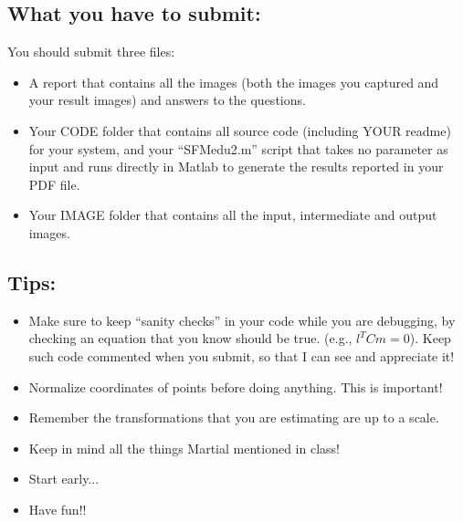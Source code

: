 \documentclass[11pt]{article}
\begin{document}
\subsection{What you have to submit:}
\label{sec:tosubmit}
You should submit three files:
\begin{itemize}
\item A report that contains all the images (both the images you captured and your result images) and answers to the questions.
\item Your CODE folder that contains all source code (including YOUR readme) for your system, and your ``SFMedu2.m'' script that takes no parameter as input and runs directly in Matlab to generate
the results reported in your PDF file.
\item Your IMAGE folder that contains all the input, intermediate and output images.
\end{itemize}


\subsection{Tips:}
\label{sec:helpercode}
\begin{itemize}
\item Make sure to keep ``sanity checks'' in your code while you are debugging, by checking an equation that you know should be true. (e.g., $l^TCm=0$). Keep such code commented when you submit, so that I can see and appreciate it!
\item Normalize coordinates of points before doing anything. This is important!
\item Remember the transformations that you are estimating are up to a scale.
\item Keep in mind all the things Martial mentioned in class!
\item Start early...
\item Have fun!!
\end{itemize}
\end{document}
